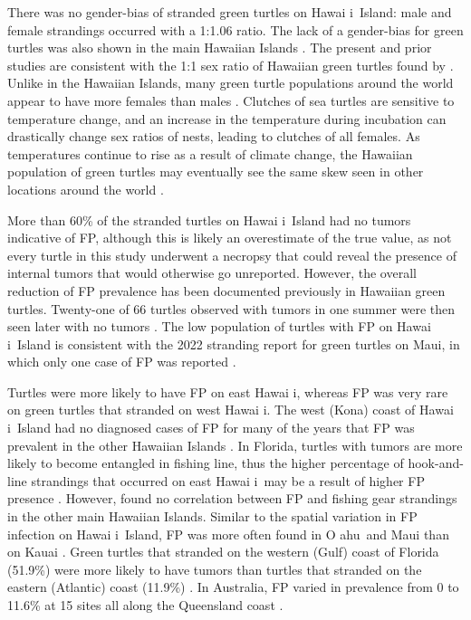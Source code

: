 \documentclass[sn-basic,NameDate]{sn-jnl}\usepackage[]{graphicx}\usepackage[]{xcolor}
\DeclareRobustCommand{\okina}{%
  \raisebox{\dimexpr\fontcharht\font`A-\height}{%
    \scalebox{0.8}{`}%
  }%
}
\newcommand{\Hawaii}{Hawai\okina i}
\newcommand{\Oahu}{O\okina ahu}
\begin{document}
There was no gender-bias of stranded green turtles on \Hawaii\ Island: male and female strandings occurred with a 1:1.06 ratio.
The lack of a gender-bias for green turtles was also shown in the main Hawaiian Islands \citep{work2004retrospective, chaloupka2008cause}. 
The present and prior studies are consistent with the 1:1 sex ratio of Hawaiian green turtles found by \cite{wibbels1993sex}. Unlike in the Hawaiian Islands, many green turtle populations around the world appear to have more females than males \citep{flint2010health, cheng2019twenty, read2023twenty}. 
Clutches of sea turtles are sensitive to temperature change, and an increase in the temperature during incubation can drastically change sex ratios of nests, leading to clutches of all females. 
As temperatures continue to rise as a result of climate change, the Hawaiian population of green turtles may eventually see the same skew seen in other locations around the world \citep{hawkes2009climate}.

More than 60\% of the stranded turtles on \Hawaii\ Island had no tumors indicative of FP, although this is likely an overestimate of the true value, as not every turtle in this study underwent a necropsy that could reveal the presence of internal tumors that would otherwise go unreported.
However, the overall reduction of FP prevalence has been documented previously in Hawaiian green turtles.
Twenty-one of 66 turtles observed with tumors in one summer were then seen later with no tumors \citep{bennett2000photographic}.
The low population of turtles with FP on \Hawaii\ Island is consistent with the 2022 stranding report for green turtles on Maui, in which only one case of FP was reported \citep{cutt2023impact}. 

Turtles were more likely to have FP on east \Hawaii, whereas FP was very rare on green turtles that stranded on west \Hawaii. 
The west (Kona) coast of \Hawaii\ Island had no diagnosed cases of FP for many of the years that FP was prevalent in the other Hawaiian Islands \citep{balazs1991current, aguirre2000blood, work2001immune}. 
In Florida, turtles with tumors are more likely to become entangled in fishing line, thus the higher percentage of hook-and-line strandings that occurred on east \Hawaii\ may be a result of higher FP presence \citep{foley2005fibropapillomatosis}. 
However, \cite{chaloupka2008cause} found no correlation between FP and fishing gear strandings in the other main Hawaiian Islands. 
Similar to the spatial variation in FP infection on \Hawaii\ Island, FP was more often found in \Oahu\ and Maui than on Kauai \citep{chaloupka2008cause}. 
Green turtles that stranded on the western (Gulf) coast of Florida (51.9\%) were more likely to have tumors than turtles that stranded on the eastern (Atlantic) coast (11.9\%) \citep{foley2005fibropapillomatosis}. 
In Australia, FP varied in prevalence from 0 to 11.6\% at 15 sites all along the Queensland coast \citep{jones2022spatial}. 
\end{document}
